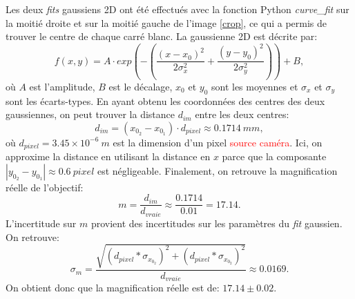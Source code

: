 \documentclass[11pt,letterpaper]{article}
\begin{document}
Les deux \textit{fits} gaussiens 2D ont été effectués avec la fonction Python \textit{curve\_fit} sur la moitié droite et sur la moitié gauche de l'image \ref{crop},
ce qui a permis de trouver le centre de chaque carré blanc. La gaussienne 2D est décrite par:
\begin{equation}
  f(x,y)=A\cdot exp\left(-\left(\frac{(x-x_0)^2}{2\sigma_x^2}+\frac{(y-y_0)^2}{2\sigma_y^2}\right)\right)+B,
\end{equation}
où $A$ est l'amplitude, $B$ est le décalage, $x_0$ et $y_0$ sont les moyennes et $\sigma_x$ et $\sigma_y$ sont les écarts-types.
En ayant obtenu les coordonnées des centres des deux gaussiennes, on peut trouver la distance $d_{im}$ entre les deux centres:
\begin{equation}
  d_{im}=(x_{0_2}-x_{0_1})\cdot d_{pixel}\approx 0.1714\ mm,
\end{equation}
où $d_{pixel}=3.45\times10^{-6} \ m$ est la dimension d'un pixel \textcolor{red}{source caméra}. Ici, on approxime la distance en utilisant la distance en $x$
parce que la composante $|y_{0_2}-y_{0_1}|\approx 0.6\ pixel$ est négligeable. Finalement, on retrouve la magnification réelle de l'objectif:
\begin{equation}
  m=\frac{d_{im}}{d_{vraie}}\approx\frac{0.1714}{0.01}= 17.14.
\end{equation}
L'incertitude sur $m$ provient des incertitudes sur les paramètres du \textit{fit} gaussien. 
On retrouve:
\begin{equation}
  \sigma_m=\frac{\sqrt{(d_{pixel}*\sigma_{x_{0_2}})^2+(d_{pixel}*\sigma_{x_{0_2}})^2}}{d_{vraie}}\approx0.0169.
\end{equation}
On obtient donc que la magnification réelle est de: $17.14\pm0.02$.
\end{document}
